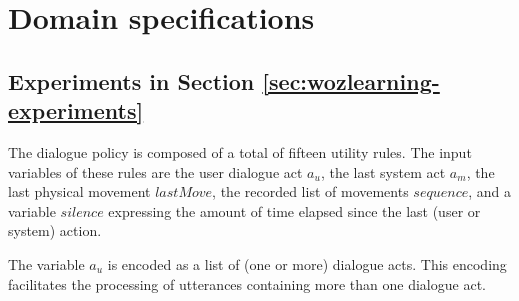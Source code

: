 
\chapter{Domain specifications}
\label{chap:domainspecs}

\section{Experiments in Section \ref{sec:wozlearning-experiments}}
\label{sec:domainspecs-wozlearning}

The dialogue policy is composed of a total of fifteen utility rules.  The input variables of these rules are the user dialogue act $a_u$, the last system act $a_m$, the last physical movement $\mathit{lastMove}$, the recorded list of movements $\mathit{sequence}$, and a variable $\mathit{silence}$ expressing the amount of time elapsed since the last (user or system) action.  

The variable $a_u$ is encoded as a list of (one or more) dialogue acts.  This encoding facilitates the processing of utterances containing more than one dialogue act.  

\renewcommand{\arraystretch}{1.0}

